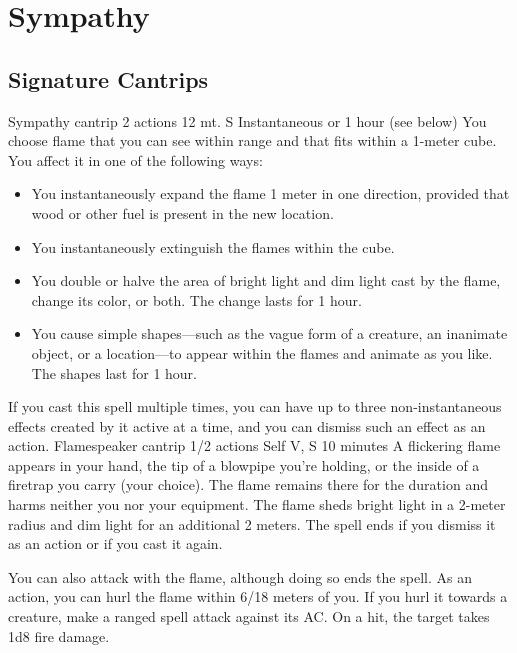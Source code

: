 \section{Sympathy}
\subsection*{Signature Cantrips}
        {Sympathy cantrip}
        {2 actions}
        {12 mt.}
        {S}
        {Instantaneous or 1 hour (see below)}
        You choose flame that you can see within range and that fits within a 1-meter cube.
        You affect it in one of the following ways:
        \begin{itemize}
            \item You instantaneously expand the flame 1 meter in one direction, provided that wood or other fuel is present in the new location.
            \item You instantaneously extinguish the flames within the cube.
            \item You double or halve the area of bright light and dim light cast by the flame, change its color, or both.
            The change lasts for 1 hour.
            \item You cause simple shapes---such as the vague form of a creature, an inanimate object, or a location---to appear within the flames and animate as you like.
            The shapes last for 1 hour.
        \end{itemize}
        If you cast this spell multiple times, you can have up to three non-instantaneous effects created by it active at a time, and you can dismiss such an effect as an action.
        {Flamespeaker cantrip}
        {1/2 actions}
        {Self}
        {V, S}
        {10 minutes}
        A flickering flame appears in your hand, the tip of a blowpipe you're holding, or the inside of a firetrap you carry (your choice).
        The flame remains there for the duration and harms neither you nor your equipment.
        The flame sheds bright light in a 2-meter radius and dim light for an additional 2 meters.
        The spell ends if you dismiss it as an action or if you cast it again.

        You can also attack with the flame, although doing so ends the spell.
        As an action, you can hurl the flame within 6/18 meters of you.
        If you hurl it towards a creature, make a ranged spell attack against its AC.
        On a hit, the target takes 1d8 fire damage.

